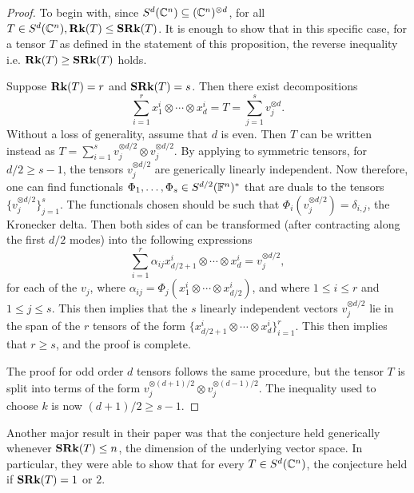 \documentclass[../Lael_John_MasterThesis_Draft.tex]{subfiles}
\begin{document}
\begin{proof}
	To begin with, since $S^d(\mathbb{C}^n) \subseteq (\mathbb{C}^{n})^{\otimes d}$, for all $T \in S^d(\mathbb{C}^n),  \textbf{Rk}(T) \leq \textbf{SRk}(T)$. It is enough to show that in this specific case, for a tensor $T$ as defined in the statement of this proposition, the reverse inequality i.e. $\textbf{Rk}(T) \geq \textbf{SRk}(T)$ holds.

	Suppose $\textbf{Rk}(T) = r$ and $\textbf{SRk}(T) = s$. Then there exist decompositions
	\begin{equation}\label{eqn:orderlargeenoughdecomposition}
		\sum_{i=1}^{r} x_1^i \otimes \cdots \otimes x_d^i = T = \sum_{j=1}^{s} v_j^{\otimes d}.	
	\end{equation}
	Without a loss of generality, assume that $d$ is even. Then $T$ can be written instead as $T = \sum_{i=1}^{s} v_j^{\otimes d/2} \otimes v_j^{\otimes d/2}$. By applying  to symmetric tensors, for $d/2 \geq s-1$, the tensors $v_j^{\otimes d/2}$ are generically linearly independent. Now therefore, one can find functionals $\Phi_1, \ldots, \Phi_s \in S^{d/2}(\mathbb{F}^n)^*$ that are duals to the tensors $\{v_j^{\otimes d/2}\}_{j=1}^s$. The functionals chosen should be such that $\Phi_i(v_j^{\otimes d/2}) = \delta_{i,j}$, the Kronecker delta. Then both sides of  can be transformed (after contracting along the first $d/2$ modes) into the following expressions$$\sum_{i=1}^{r} \alpha_{ij}x_{d/2 + 1}^i\otimes \cdots \otimes x_{d}^i = v_j^{\otimes d/2},$$for each of the $v_j$, where $\alpha_{ij} = \Phi_j(x_1^i \otimes \cdots \otimes x_{d/2}^i)$, and where $1 \leq i \leq r$ and $1 \leq j \leq s$. This then implies that the $s$ linearly independent vectors $v_j^{\otimes d/2}$ lie in the span of the $r$ tensors of the form $\{x_{d/2 + 1}^i \otimes \cdots \otimes x_d^i\}_{i=1}^r$. This then implies that $r \geq s$, and the proof is complete.

	The proof for odd order $d$ tensors follows the same procedure, but the tensor $T$ is split into terms of the form $v_j^{\otimes (d+1)/2} \otimes v_j^{\otimes (d-1)/2}$. The inequality used to choose $k$ is now $(d+1)/2 \geq s-1$.
\end{proof}

Another major result in their paper was that the conjecture held generically whenever $\textbf{SRk}(T) \leq n$, the dimension of the underlying vector space. In particular, they were able to show that for every $T\in S^d(\mathbb{C}^n)$, the conjecture held if $\textbf{SRk}(T) = 1$ or $2$.
\end{document}
